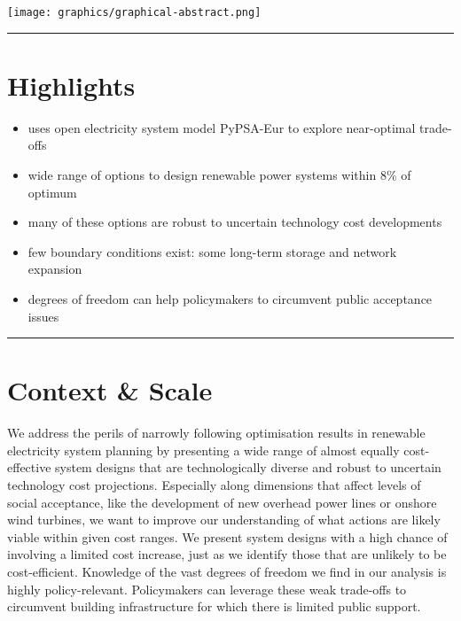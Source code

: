 \documentclass[1p,11pt]{elsarticle}
\begin{document}
\texttt{[image: graphics/graphical-abstract.png]}

\par\noindent\rule{\textwidth}{0.4pt}

\section*{Highlights}

\begin{itemize}
	\item uses open electricity system model PyPSA-Eur to explore near-optimal trade-offs
	\item wide range of options to design renewable power systems within 8\% of optimum
	\item many of these options are robust to uncertain technology cost developments
	\item few boundary conditions exist: some long-term storage and network expansion
	\item degrees of freedom can help policymakers to circumvent public acceptance issues
\end{itemize}

\par\noindent\rule{\textwidth}{0.4pt}

\section*{Context \& Scale}

We address the perils of narrowly following optimisation results in renewable
electricity system planning by presenting a wide range of almost equally
cost-effective system designs that are technologically diverse and robust to
uncertain technology cost projections. Especially along dimensions that affect
levels of social acceptance, like the development of new overhead power lines or
onshore wind turbines, we want to improve our understanding of what actions are
likely viable within given cost ranges. We present system designs with a high
chance of involving a limited cost increase, just as we identify those that are
unlikely to be cost-efficient. Knowledge of the vast degrees of freedom we find
in our analysis is highly policy-relevant. Policymakers can leverage these weak
trade-offs to circumvent building infrastructure for which there is limited
public support.

\end{document}
